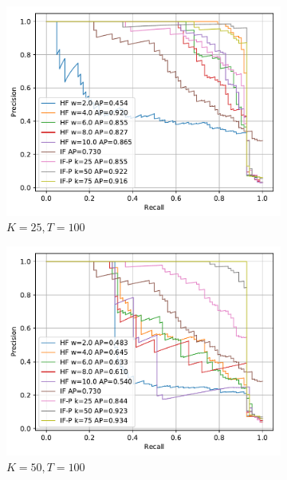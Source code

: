 \documentclass[11pt,onecolumn]{article}
\begin{document}
\begin{figure}[ht!]
    \centering
    \begin{subfigure}[t]{0.32\textwidth}
        \centering
        \includegraphics[width=\linewidth]{fig/k25T100_prcurves.pdf}
        \caption{$K=25, T=100$}
    \end{subfigure}
    \hfill
    \begin{subfigure}[t]{0.32\textwidth}
        \centering
        \includegraphics[width=\linewidth]{fig/k50T100_prcurves.pdf}
        \caption{$K=50, T=100$}
    \end{subfigure}
		\hfill
    \begin{subfigure}[t]{0.32\textwidth}
        \centering

\end{subfigure}
\end{figure}
\end{document}
